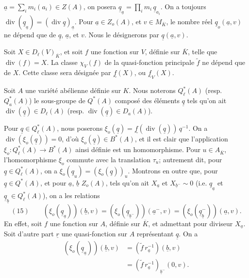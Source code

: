 $\underline a=\sum_i m_i(a_i)\in Z(A)$, on posera $\underline q_{\underline a}=\prod_i m_i\,\underline q_{a_i}$. On a toujours $\operatorname{div}(\underline q_{\underline a})=(\operatorname{div}\underline q)_{\underline a}$. Pour $\underline a\in Z_o(A)$, et $v\in M_{\overline K}$, le nombre réel $\underline q_o(\underline a,v)$ ne dépend que de $\underline q$, $\underline a$, et $v$. Nous le désignerons par $\underline q(\underline a,v)$.

Soit $X\in D_\ell(V)_{\overline K}$, et soit $f$ une fonction sur $V$, définie sur $\overline K$, telle que $\operatorname{div}(f)=X$. La classe $\chi_V(f)$ de la quasi-fonction principale $\widetilde f$ ne dépend que de $X$. Cette classe sera désignée par $\underset{\sim}{f}(X)$, ou $\underset{\sim}{f}_V(X)$.

Soit $A$ une variété abélienne définie sur $K$. Nous noterons $Q^*_\ell(A)$ (resp. $Q^*_a(A)$) le sous-groupe de $Q^*(A)$ composé des éléments $\underline q$ tels qu'on ait $\operatorname{div}(\underline q)\in D_\ell(A)$ (resp. $\operatorname{div}(\underline q)\in D_a(A)$).

Pour $\underline q\in Q^*_\ell(A)$, nous poserons $\xi_o(\underline q)=\underset{\sim}{f}(\operatorname{div}(\underline q))\,q^{-1}$. On a $\operatorname{div}(\xi_o(\underline q))=0$, d'où $\xi_o(\underline q)\in B^*(A)$, et il est clair que l'application $\xi_o:Q^*_\ell(A)\longrightarrow B^*(A)$ ainsi définie est un homomorphisme. Pour $u\in A_{\overline K}$, l'homomorphisme $\xi_o$ commute avec la translation $\tau_u$; autrement dit, pour $\underline q\in Q^*_\ell(A)$, on a $\xi_o(\underline q_u)=(\xi_o(\underline q))_u$. Montrons en outre que, pour $\underline q\in Q^*(A)$, et pour $\underline a$, $\underline b$ $Z_o(A)$, tels qu'on ait $X_{\underline a}$ et $X_{\underline b^-}\sim0$ (i.e. $\underline q_{\underline a}$ et $\underline q_{\underline b}\in Q^*_\ell(A)$), on a les relations
\[
(15)\qquad (\xi_o(\underline q_{\underline a}))(\underline b,v)=(\xi_o(\underline q_{\underline b^-}))(\underline a^-,v)=(\xi_o(\underline q^-_{\underline b}))(\underline a,v).
\]
En effet, soit $f$ une fonction sur $A$, définie sur $\overline K$, et admettant pour diviseur $X_{\underline a}$. Soit d'autre part $\underline r$ une quasi-fonction sur $A$ représentant $\underline q$. On a
\[
\begin{aligned}
(\xi_o(\underline q_{\underline a}))(\underline b,v)&=(\widetilde f\,r_{\underline a}^{-1})(\underline b,v)\\
&=(\widetilde f\,r_{\underline a}^{-1})_{\underline b^-}(0,v).
\end{aligned}
\]
